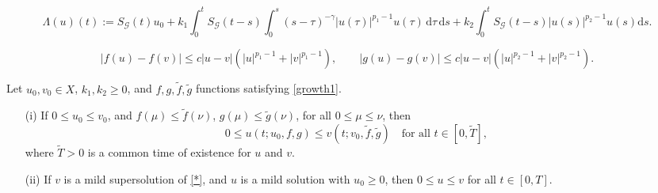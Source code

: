 \documentclass[10pt,a4paper]{amsart}
\newcommand{\abs}[1]{\lvert#1\rvert}
\begin{document}
	\begin{equation}\label{solop}
		\Lambda(u)(t):=S_{\mathcal{G}}(t)u_0 +k_1 \int_{0}^{t}S_{\mathcal{G}}(t-s) \int_0^s(s-\tau)^{-\gamma}\abs{u(\tau)}^{p_1-1}u(\tau) \, \mathrm{d}\tau \,\mathrm{d}s + k_2\int_{0}^{t}S_{\mathcal{G}}(t-s) |u(s)|^{p_2-1}u(s) \mathrm{d}s.
	\end{equation}

\begin{equation}\label{growth1}
	|f(u)-f(v)| \leq c|u-v|(|u|^{p_1-1} + |v|^{p_1-1}),\quad\quad |g(u)-g(v)| \leq c|u-v|(|u|^{p_2-1} + |v|^{p_2-1}).
\end{equation}

\begin{theorem}\label{comparison}
	Let $u_0,v_0\in X$, $k_1,k_2\geq 0$, and $f,g, \tilde{f}, \tilde{g}$ functions satisfying \eqref{growth1}.
	\begin{itemize}
		\item[(i)] If $0\leq u_0\leq v_0$, and $f(\mu)\leq \tilde{f}(\nu)$, $g(\mu)\leq \tilde{g}(\nu)$, for all $0\leq\mu\leq \nu$, then 
		$$0\leq u(t;u_0,f,g) \leq v(t;v_0,\tilde{f},\tilde{g})\quad\text{for all}\,\, t\in[0,\tilde{T}],$$
		where $\tilde{T}>0$ is a common time of existence for $u$ and $v$.
		\item[(ii)]  If $v$ is a mild supersolution of \eqref{*}, and $u$ is a mild solution with $u_0\geq0$, then $0\leq u\leq v$ for all $t\in[0,T]$.
	\end{itemize}
\end{theorem}
\end{document}
